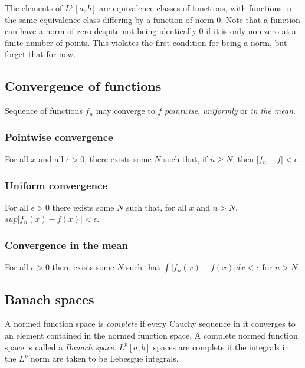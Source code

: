 \documentclass[]{article}
\begin{document}
The elements of $L^{p}[a,b]$ are equivalence classes of functions, with functions in the same equivalence class differing by a function of norm $0$. Note that a function can have a norm of zero despite not being identically 0 if it is only non-zero at a finite number of points. This violates the first condition for being a norm, but forget that for now.

\subsection{Convergence of functions}
Sequence of functions $f_{n}$ may converge to $f$ \textit{pointwise}, \textit{uniformly} or \textit{in the mean}.
\subsubsection{Pointwise convergence}
For all $x$ and all $\epsilon > 0$, there exists some $N$ such that, if $n \geq N$, then $|f_{n} - f| < \epsilon$. 
\subsubsection{Uniform convergence}
For all $\epsilon > 0$ there exists some $N$ such that, for all $x$ and $n > N$, $sup|f_{n}(x) - f(x)| < \epsilon$.
\subsubsection{Convergence in the mean}
For all $\epsilon > 0$ there exists some $N$ such that $\int |f_{n}(x) - f(x)|dx < \epsilon$ for $n > N$.

\subsection{Banach spaces}
A normed function space is \textit{complete} if every Cauchy sequence in it converges to an element contained in the normed function space. A complete normed function space is called a \textit{Banach space}. $L^{p}[a,b]$ spaces are complete if the integrals in the $L^{p}$ norm are taken to be Lebesgue integrals.
\end{document}
